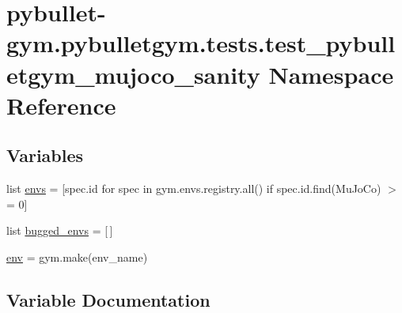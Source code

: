 \hypertarget{namespacepybullet-gym_1_1pybulletgym_1_1tests_1_1test__pybulletgym__mujoco__sanity}{}\section{pybullet-\/gym.pybulletgym.\+tests.\+test\+\_\+pybulletgym\+\_\+mujoco\+\_\+sanity Namespace Reference}
\label{namespacepybullet-gym_1_1pybulletgym_1_1tests_1_1test__pybulletgym__mujoco__sanity}
\subsection*{Variables}
\begin{DoxyCompactItemize}
\item 
list \hyperlink{namespacepybullet-gym_1_1pybulletgym_1_1tests_1_1test__pybulletgym__mujoco__sanity_acf44996f461bd25dc4a6d286c032c682}{envs} = \mbox{[}spec.\+id for spec in gym.\+envs.\+registry.\+all() if spec.\+id.\+find(\textquotesingle{}Mu\+Jo\+Co\textquotesingle{}) $>$= 0\mbox{]}
\item 
list \hyperlink{namespacepybullet-gym_1_1pybulletgym_1_1tests_1_1test__pybulletgym__mujoco__sanity_a9c7eee756049f836811bae3fcf98033d}{bugged\+\_\+envs} = \mbox{[}$\,$\mbox{]}
\item 
\hyperlink{namespacepybullet-gym_1_1pybulletgym_1_1tests_1_1test__pybulletgym__mujoco__sanity_a2e501f9c22728515fa9a745e292de23f}{env} = gym.\+make(env\+\_\+name)
\end{DoxyCompactItemize}


\subsection{Variable Documentation}
